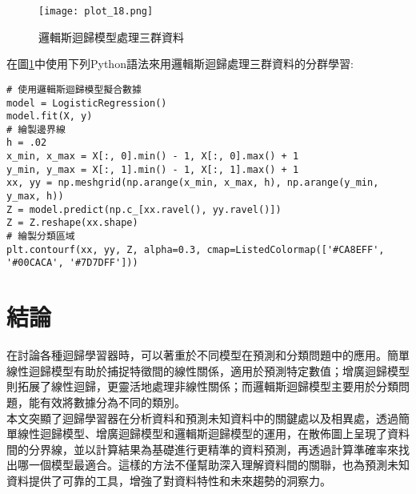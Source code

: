 \documentclass[12pt, a4paper]{article}
\begin{document}
\begin{figure}[H]
\centering
\texttt{[image: plot\_18.png]}
\caption{邏輯斯迴歸模型處理三群資料}
\label{fig:plot_20.png}
\end{figure}

在圖\;\ref{fig:plot_20.png}\;中使用下列Python語法來用邏輯斯迴歸處理三群資料的分群學習\;:
\begin{lstlisting}
# 使用邏輯斯迴歸模型擬合數據
model = LogisticRegression()
model.fit(X, y)
# 繪製邊界線
h = .02 
x_min, x_max = X[:, 0].min() - 1, X[:, 0].max() + 1
y_min, y_max = X[:, 1].min() - 1, X[:, 1].max() + 1
xx, yy = np.meshgrid(np.arange(x_min, x_max, h), np.arange(y_min, y_max, h))
Z = model.predict(np.c_[xx.ravel(), yy.ravel()])
Z = Z.reshape(xx.shape)
# 繪製分類區域
plt.contourf(xx, yy, Z, alpha=0.3, cmap=ListedColormap(['#CA8EFF', '#00CACA', '#7D7DFF']))
\end{lstlisting}

\section{結論}
在討論各種迴歸學習器時，可以著重於不同模型在預測和分類問題中的應用。簡單線性迴歸模型有助於捕捉特徵間的線性關係，適用於預測特定數值；增廣迴歸模型則拓展了線性迴歸，更靈活地處理非線性關係；而邏輯斯迴歸模型主要用於分類問題，能有效將數據分為不同的類別。\\
本文突顯了迴歸學習器在分析資料和預測未知資料中的關鍵處以及相異處，透過簡單線性迴歸模型、增廣迴歸模型和邏輯斯迴歸模型的運用，在散佈圖上呈現了資料間的分界線，並以計算結果為基礎進行更精準的資料預測，再透過計算準確率來找出哪一個模型最適合。這樣的方法不僅幫助深入理解資料間的關聯，也為預測未知資料提供了可靠的工具，增強了對資料特性和未來趨勢的洞察力。
\end{document}
